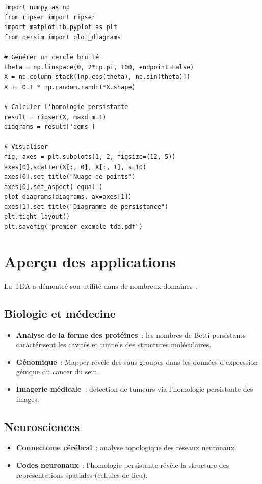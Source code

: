 \begin{codeblock}[title=\textbf{Premier exemple avec Ripser}]
\begin{verbatim}
import numpy as np
from ripser import ripser
import matplotlib.pyplot as plt
from persim import plot_diagrams

# Générer un cercle bruité
theta = np.linspace(0, 2*np.pi, 100, endpoint=False)
X = np.column_stack([np.cos(theta), np.sin(theta)])
X += 0.1 * np.random.randn(*X.shape)

# Calculer l'homologie persistante
result = ripser(X, maxdim=1)
diagrams = result['dgms']

# Visualiser
fig, axes = plt.subplots(1, 2, figsize=(12, 5))
axes[0].scatter(X[:, 0], X[:, 1], s=10)
axes[0].set_title("Nuage de points")
axes[0].set_aspect('equal')
plot_diagrams(diagrams, ax=axes[1])
axes[1].set_title("Diagramme de persistance")
plt.tight_layout()
plt.savefig("premier_exemple_tda.pdf")
\end{verbatim}
\end{codeblock}

\section{Aper\c{c}u des applications}

La TDA a d\'emontr\'e son utilit\'e dans de nombreux domaines~:

\subsection{Biologie et m\'edecine}
\begin{itemize}
  \item \textbf{Analyse de la forme des prot\'eines}~: les nombres de
        Betti persistants caract\'erisent les cavit\'es et tunnels des
        structures mol\'eculaires.
  \item \textbf{G\'enomique}~: Mapper r\'ev\`ele des sous-groupes dans
        les donn\'ees d'expression g\'enique du cancer du sein.
  \item \textbf{Imagerie m\'edicale}~: d\'etection de tumeurs via
        l'homologie persistante des images.
\end{itemize}

\subsection{Neurosciences}
\begin{itemize}
  \item \textbf{Connectome c\'er\'ebral}~: analyse topologique des
        r\'eseaux neuronaux.
  \item \textbf{Codes neuronaux}~: l'homologie persistante r\'ev\`ele
        la structure des repr\'esentations spatiales (cellules de lieu).
\end{itemize}

